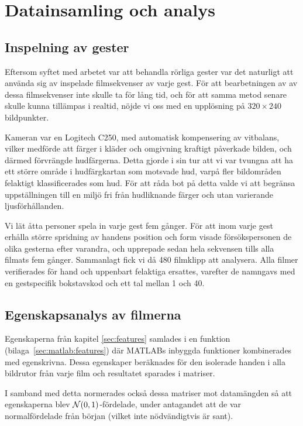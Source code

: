 \documentclass[../rapport_MVEX01-11-05]{subfiles}
\begin{document}
\section{Datainsamling och analys}

\subsection{Inspelning av gester}
Eftersom syftet med arbetet var att behandla rörliga
gester var det naturligt att 
använda sig av inspelade filmsekvenser av varje gest.
För att bearbetningen av av dessa filmsekvenser inte skulle ta för lång tid,
och för att samma metod senare skulle kunna tillämpas i realtid,
nöjde vi oss med en upplösning på $320\times240$ bildpunkter.

Kameran var en Logitech C250, med automatisk kompensering av vitbalans,
vilker medförde att färger i kläder och omgivning kraftigt påverkade bilden,
och därmed förvrängde hudfärgerna. Detta gjorde i sin tur att vi var
tvungna att ha ett större område i hudfärgkartan
som motsvade hud, varpå fler bildområden felaktigt klassificerades som hud.
För att råda
bot på detta valde vi att begränsa uppställningen till en miljö fri från
hudliknande färger och utan varierande ljusförhållanden.

Vi lät åtta personer spela in varje gest fem gånger.
För att inom varje gest erhålla större spridning av handens position och form
visade försökspersonen de olika gesterna efter varandra, och upprepade sedan
hela sekvensen tills alla filmats fem gånger. Sammanlagt fick vi då 480
filmklipp att analysera.
Alla filmer verifierades för hand och uppenbart felaktiga ersattes, varefter
de namngavs med en gestspecifik bokstavskod och ett tal mellan 1 och 40.

\subsection{Egenskapsanalys av filmerna}
Egenskaperna från kapitel \ref{sec:features} samlades i en funktion
(bilaga~\ref{sec:matlab:features}) där MATLABs inbyggda funktioner kombinerades
med egenskrivna.
Dessa egenskaper beräknades
för den isolerade handen i alla bildrutor från varje film och resultatet
sparades i matriser.

I samband med detta normerades också dessa
matriser mot datamängden så att egenskaperna blev $\mathcal{N}(0,1)$-fördelade,
under antagandet att de var normalfördelade från början (vilket inte
nödvändigtvis är sant).
\end{document}
